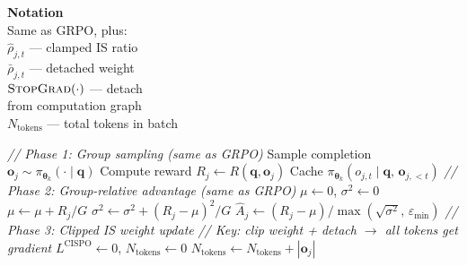 \documentclass[11pt]{article}
\begin{document}
\begin{algorithm}[p]
\begin{minipage}[t]{0.28\linewidth}
\vspace{6pt}
\textbf{Notation} \\[2pt]
Same as GRPO, plus: \\
$\hat{\rho}_{j,t}$ --- clamped IS ratio \\
$\bar{\rho}_{j,t}$ --- detached weight \\
$\textsc{StopGrad}(\cdot)$ --- detach \\
\hspace*{1em}from computation graph \\
$N_{\text{tokens}}$ --- total tokens in batch
\end{minipage}%
\hfill
\vrule
\hfill
\begin{minipage}[t]{0.68\linewidth}
\begin{algorithmic}[1]
    \Statex \hspace{\algorithmicindent}\textit{// Phase 1: Group sampling (same as GRPO)}
            \State Sample completion $\mathbf{o}_j \sim \pi_{\boldsymbol{\theta}_k}(\cdot \mid \mathbf{q})$
            \State Compute reward $R_j \gets R(\mathbf{q}, \mathbf{o}_j)$
                \State Cache $\pi_{\boldsymbol{\theta}_k}(o_{j,t} \mid \mathbf{q},\, \mathbf{o}_{j,<t})$
            \EndFor
        \EndFor
    \EndFor
    \Statex \hspace{\algorithmicindent}\textit{// Phase 2: Group-relative advantage (same as GRPO)}
        \State $\mu \gets 0$, \; $\sigma^2 \gets 0$
            \State $\mu \gets \mu + R_j / G$
        \EndFor
            \State $\sigma^2 \gets \sigma^2 + (R_j - \mu)^2 / G$
        \EndFor
            \State $\hat{A}_j \gets (R_j - \mu) / \max(\sqrt{\sigma^2},\, \varepsilon_{\min})$
        \EndFor
    \EndFor
    \Statex \hspace{\algorithmicindent}\textit{// Phase 3: Clipped IS weight update}
    \Statex \hspace{\algorithmicindent}\textit{// Key: clip weight + detach $\rightarrow$ all tokens get gradient}
            \State $L^{\text{CISPO}} \gets 0$, \; $N_{\text{tokens}} \gets 0$
                \State $N_{\text{tokens}} \gets N_{\text{tokens}} + |\mathbf{o}_j|$

\end{algorithmic}
\end{minipage}
\end{algorithm}
\end{document}
